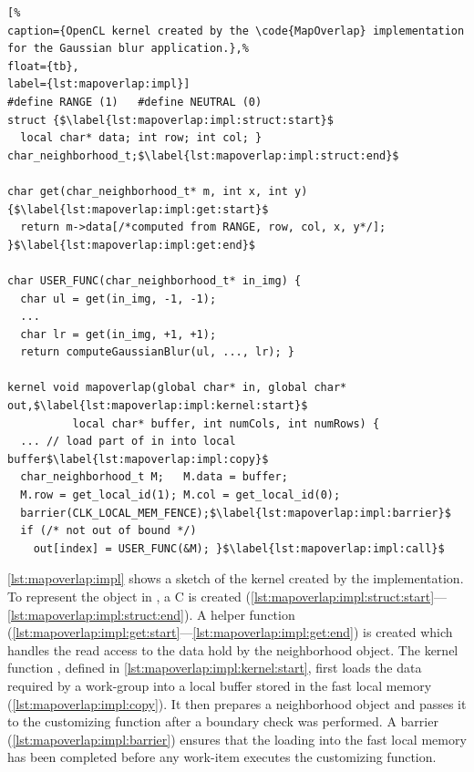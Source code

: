 \begin{lstlisting}[%
caption={OpenCL kernel created by the \code{MapOverlap} implementation for the Gaussian blur application.},%
float={tb},
label={lst:mapoverlap:impl}]
#define RANGE (1)   #define NEUTRAL (0)
struct {$\label{lst:mapoverlap:impl:struct:start}$
  local char* data; int row; int col; } char_neighborhood_t;$\label{lst:mapoverlap:impl:struct:end}$

char get(char_neighborhood_t* m, int x, int y) {$\label{lst:mapoverlap:impl:get:start}$
  return m->data[/*computed from RANGE, row, col, x, y*/]; }$\label{lst:mapoverlap:impl:get:end}$

char USER_FUNC(char_neighborhood_t* in_img) {
  char ul = get(in_img, -1, -1);
  ...
  char lr = get(in_img, +1, +1);
  return computeGaussianBlur(ul, ..., lr); }

kernel void mapoverlap(global char* in, global char* out,$\label{lst:mapoverlap:impl:kernel:start}$
          local char* buffer, int numCols, int numRows) {
  ... // load part of in into local buffer$\label{lst:mapoverlap:impl:copy}$
  char_neighborhood_t M;   M.data = buffer;
  M.row = get_local_id(1); M.col = get_local_id(0);
  barrier(CLK_LOCAL_MEM_FENCE);$\label{lst:mapoverlap:impl:barrier}$
  if (/* not out of bound */)
    out[index] = USER_FUNC(&M); }$\label{lst:mapoverlap:impl:call}$
\end{lstlisting}

\autoref{lst:mapoverlap:impl} shows a sketch of the \OpenCL kernel created by the  implementation.
To represent the  object in \OpenCL, a C  is created (\autoref{lst:mapoverlap:impl:struct:start}---\autoref{lst:mapoverlap:impl:struct:end}).
A helper function  (\autoref{lst:mapoverlap:impl:get:start}---\autoref{lst:mapoverlap:impl:get:end}) is created which handles the read access to the data hold by the neighborhood object.
The kernel function , defined in \autoref{lst:mapoverlap:impl:kernel:start}, first loads the data required by a work-group into a local buffer stored in the fast local \GPU memory (\autoref{lst:mapoverlap:impl:copy}).
It then prepares a neighborhood object and passes it to the customizing function after a boundary check was performed.
A barrier (\autoref{lst:mapoverlap:impl:barrier}) ensures that the loading into the fast local memory has been completed before any work-item executes the customizing function.

